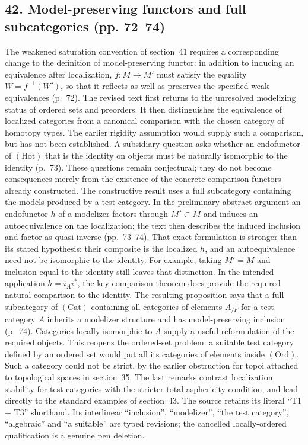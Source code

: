 \documentclass[10pt,oneside]{book}
\begin{document}
\subsection*{42. Model-preserving functors and full subcategories (pp. 72--74)}
The weakened saturation convention of section~41 requires a corresponding change to the definition of model-preserving functor: in addition to inducing an equivalence after localization, $f:M\to M'$ must satisfy the equality $W=f^{-1}(W')$, so that it reflects as well as preserves the specified weak equivalences (p.~72). The revised text first returns to the unresolved modelizing status of ordered sets and preorders. It then distinguishes the equivalence of localized categories from a canonical comparison with the chosen category of homotopy types. The earlier rigidity assumption would supply such a comparison, but has not been established. A subsidiary question asks whether an endofunctor of $(\mathrm{Hot})$ that is the identity on objects must be naturally isomorphic to the identity (p.~73). These questions remain conjectural; they do not become consequences merely from the existence of the concrete comparison functors already constructed. The constructive result uses a full subcategory containing the models produced by a test category. In the preliminary abstract argument an endofunctor $h$ of a modelizer factors through $M'\subset M$ and induces an autoequivalence on the localization; the text then describes the induced inclusion and factor as quasi-inverse (pp.~73--74). That exact formulation is stronger than its stated hypothesis: their composite is the localized $h$, and an autoequivalence need not be isomorphic to the identity. For example, taking $M'=M$ and inclusion equal to the identity still leaves that distinction. In the intended application $h=i_Ai^*$, the key comparison theorem does provide the required natural comparison to the identity. The resulting proposition says that a full subcategory of $(\mathrm{Cat})$ containing all categories of elements $A_{/F}$ for a test category $A$ inherits a modelizer structure and has model-preserving inclusion (p.~74). Categories locally isomorphic to $A$ supply a useful reformulation of the required objects. This reopens the ordered-set problem: a suitable test category defined by an ordered set would put all its categories of elements inside $(\mathrm{Ord})$. Such a category could not be strict, by the earlier obstruction for topoi attached to topological spaces in section~35. The last remarks contrast localization stability for test categories with the stricter total-asphericity condition, and lead directly to the standard examples of section~43. The source retains its literal ``T1 + T3'' shorthand. Its interlinear ``inclusion'', ``modelizer'', ``the test category'', ``algebraic'' and ``a suitable'' are typed revisions; the cancelled locally-ordered qualification is a genuine pen deletion.
\end{document}
